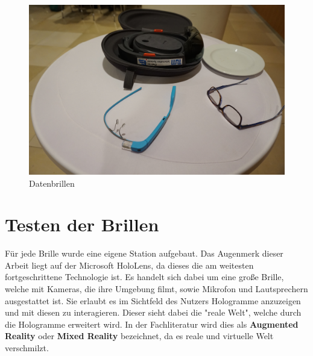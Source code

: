 \begin{figure}[h]
	\begin{center}
		\noindent\includegraphics[width=\linewidth,height=\textheight,keepaspectratio]{Resources/Datenbrillen.jpg}
		\caption{Datenbrillen}
		\label{datenbrillen}
	\end{center}
\end{figure}

\section{Testen der Brillen}

Für jede Brille wurde eine eigene Station aufgebaut. Das Augenmerk dieser Arbeit liegt auf der Microsoft HoloLens, da dieses die am weitesten fortgeschrittene Technologie ist. Es handelt sich dabei um eine große Brille, welche mit Kameras, die ihre Umgebung filmt, sowie Mikrofon und Lautsprechern ausgestattet ist. Sie erlaubt es im Sichtfeld des Nutzers Hologramme anzuzeigen und mit diesen zu interagieren. Dieser sieht dabei die "reale Welt", welche durch die Hologramme erweitert wird. In der Fachliteratur wird dies als \textbf{Augmented Reality} oder \textbf{Mixed Reality} bezeichnet, da es reale und virtuelle Welt verschmilzt.


